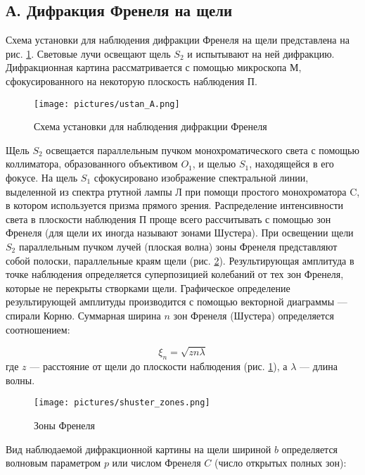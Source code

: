 \documentclass[a4paper,12pt]{article}
\begin{document}
\subsection*{А. Дифракция Френеля на щели}

Схема установки для наблюдения дифракции Френеля на щели представлена на рис. \ref{labA}. Световые лучи освещают щель $ S_2 $ и испытывают на ней дифракцию. Дифракционная картина рассматривается с помощью микроскопа М, сфокусированного на некоторую плоскость наблюдения П.

\FloatBarrier
\begin{figure}[h]
	\centering
	\texttt{[image: pictures/ustan\_A.png]}
	\caption{Схема установки для наблюдения дифракции Френеля}
	\label{labA}
\end{figure}
\FloatBarrier

Щель $ S_2 $ освещается параллельным пучком монохроматического света с помощью коллиматора, образованного объективом $ O_1 $, и щелью $S_1$, находящейся в его фокусе. На щель $ S_1 $ сфокусировано изображение спектральной линии, выделенной из спектра ртутной лампы Л при помощи простого монохроматора C, в котором используется призма прямого зрения. Распределение интенсивности света в плоскости наблюдения П проще всего рассчитывать с помощью зон Френеля (для щели их иногда называют зонами Шустера). При освещении щели $ S_2 $ параллельным пучком лучей (плоская волна) зоны Френеля представляют собой полоски, параллельные краям щели (рис. \ref{zone}). Результирующая амплитуда в точке наблюдения определяется суперпозицией колебаний от тех зон Френеля, которые не перекрыты створками щели. Графическое определение результирующей амплитуды производится с помощью векторной диаграммы --- спирали Корню. Суммарная ширина $ n $ зон Френеля (Шустера) определяется соотношением:

\begin{equation}\label{xin}
\xi_n = \sqrt{zn\lambda}
\end{equation}
где $ z $ --- расстояние от щели до плоскости наблюдения (рис. \ref{labA}), а $ \lambda $ --- длина волны.

\FloatBarrier
\begin{figure}[h]
	\begin{center}
		\texttt{[image: pictures/shuster\_zones.png]}
	\end{center}
	\caption{Зоны Френеля}
	\label{zone}
\end{figure}
\FloatBarrier

Вид наблюдаемой дифракционной картины
на щели шириной $ b $ определяется волновым параметром $ p $ или числом Френеля $ C $ (число открытых полных зон):
\end{document}
